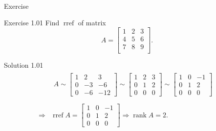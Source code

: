 \documentclass[11pt,aspectratio=169]{beamer}
\begin{document}
    \begin{frame}[t]{Exercise}
        \par \textcolor{yy}{Exercise 1.01} Find $\operatorname{rref}$ of matrix $$A = \left[ \begin{array}{ccc} 1&2&3 \\ 4&5&6 \\ 7&8&9 \\ \end{array}\right].$$

        \phantom{yy}

        \pause 
        \par \textcolor{yy}{Solution 1.01}
        \begin{equation*}
            \begin{aligned}
                & \begin{gathered}
                    A \sim\left[\begin{array}{ccc}
                    1 & 2 & 3 \\
                    0 & -3 & -6 \\
                    0 & -6 & -12
                    \end{array}\right] \sim\left[\begin{array}{ccc}
                    1 & 2 & 3 \\
                    0 & 1 & 2 \\
                    0 & 0 & 0
                    \end{array}\right] \sim\left[\begin{array}{ccc}
                    1 & 0 & -1 \\
                    0 & 1 & 2 \\
                    0 & 0 & 0
                    \end{array}\right] \\
                \end{gathered} \\
            \Rightarrow & \operatorname{rref} A=\left[\begin{array}{ccc}
                1 & 0 & -1 \\
                0 & 1 & 2 \\
                0 & 0 & 0
                \end{array}\right] \Rightarrow \operatorname{rank} A=2.
            \end{aligned}
        \end{equation*}
    \end{frame}
\end{document}
